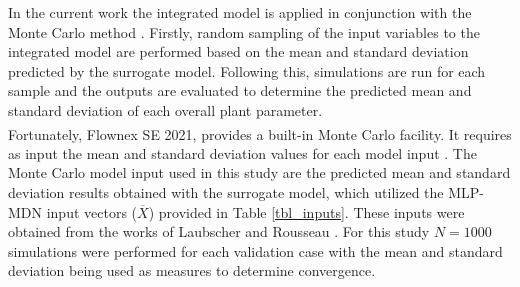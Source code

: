 \documentclass[a4paper,fleqn]{cas-dc}
\begin{document}
In the current work the integrated model is applied in conjunction with the Monte Carlo method \cite{Thomopoulos2013}. Firstly, random sampling of the input variables to the integrated model are performed based on the mean and standard deviation predicted by the surrogate model.  Following this, simulations are run for each sample and the outputs are evaluated to determine the predicted mean and standard deviation of each overall plant parameter.\\

Fortunately, Flownex SE\textsuperscript{\textregistered} 2021, provides a built-in Monte Carlo facility. It requires as input the mean and standard deviation values for each model input \cite{flownex}. The Monte Carlo model input used in this study are the predicted mean and standard deviation results obtained with the surrogate model, which utilized the MLP-MDN input vectors ($\overline{X}$) provided in Table \ref{tbl_inputs}. These inputs were obtained from the works of Laubscher and Rousseau \cite{Laubscher2019b}. For this study $N=1000$ simulations were performed for each validation case with the mean and standard deviation being used as measures to determine convergence. \\
\end{document}
